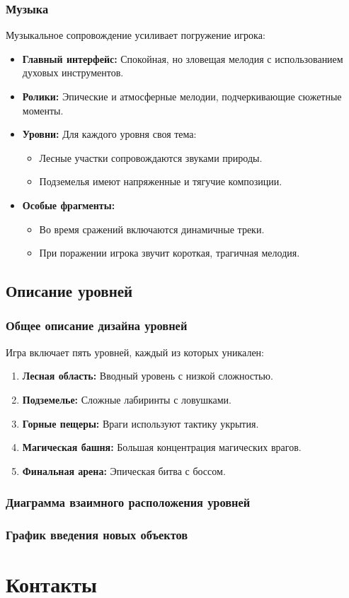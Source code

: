 \documentclass{article}
\begin{document}
\subsubsection{Музыка}
Музыкальное сопровождение усиливает погружение игрока:
\begin{itemize}
    \item \textbf{Главный интерфейс:} Спокойная, но зловещая мелодия с использованием духовых инструментов.
    \item \textbf{Ролики:} Эпические и атмосферные мелодии, подчеркивающие сюжетные моменты.
    \item \textbf{Уровни:} Для каждого уровня своя тема:
    \begin{itemize}
        \item Лесные участки сопровождаются звуками природы.
        \item Подземелья имеют напряженные и тягучие композиции.
    \end{itemize}
    \item \textbf{Особые фрагменты:}
    \begin{itemize}
        \item Во время сражений включаются динамичные треки.
        \item При поражении игрока звучит короткая, трагичная мелодия.
    \end{itemize}
\end{itemize}

\subsection{Описание уровней}
\subsubsection{Общее описание дизайна уровней}
Игра включает пять уровней, каждый из которых уникален:
\begin{enumerate}
    \item \textbf{Лесная область:} Вводный уровень с низкой сложностью.
    \item \textbf{Подземелье:} Сложные лабиринты с ловушками.
    \item \textbf{Горные пещеры:} Враги используют тактику укрытия.
    \item \textbf{Магическая башня:} Большая концентрация магических врагов.
    \item \textbf{Финальная арена:} Эпическая битва с боссом.
\end{enumerate}
\subsubsection{Диаграмма взаимного расположения уровней}
\subsubsection{График введения новых объектов}

\section{Контакты}

\newpage
\end{document}
